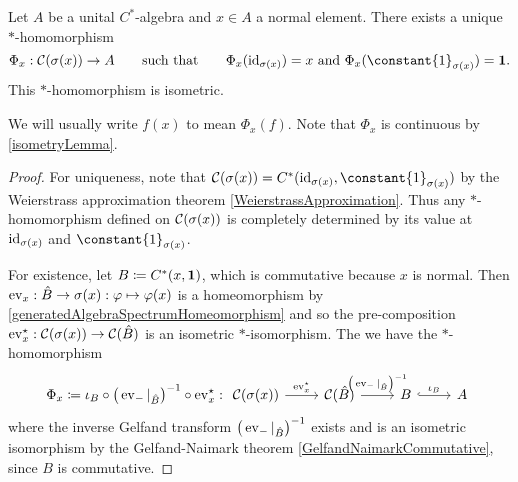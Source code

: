 \begin{theorem} \label{continuousFunctionalCalculus}
Let $A$ be a unital $C^*$-algebra and $x\in A$ a normal element. There exists a unique $*$-homomorphism
\[ \Phi_x: \cont(\spec(x))\to A \qquad \text{such that} \qquad \text{$\Phi_x(\id_{\spec(x)}) = x$ and $\Phi_x(\constant{1}_{\spec(x)}) = \vec{1}$.} \]
This $*$-homomorphism is isometric.
\end{theorem}
We will usually write $f(x)$ to mean $\Phi_x(f)$. Note that $\Phi_x$ is continuous by \ref{isometryLemma}.
\begin{proof}
For uniqueness, note that $\cont(\spec(x)) = C^*(\id_{\spec(x)}, \constant{1}_{\spec(x)})$ by the Weierstrass approximation theorem \ref{WeierstrassApproximation}. Thus any $*$-homomorphism defined on $\operatorname{\mathcal{C}}(\sigma(x))$ is completely determined by its value at $\operatorname{id}_{\sigma(x)}$ and $\constant{1}_{\spec(x)}$.

For existence, let $B \coloneqq C^*(x,\boldsymbol{\mathrm{1}})$, which is commutative because $x$ is normal. Then $\operatorname{ev}_x: \hat{B}\to \sigma(x): \varphi\mapsto \varphi(x)$ is a homeomorphism by \ref{generatedAlgebraSpectrumHomeomorphism} and so the pre-composition $\operatorname{ev}_x^\star: \mathcal{C}(\sigma(x))\to \mathcal{C}(\hat{B})$ is an isometric $*$-isomorphism. The we have the $*$-homomorphism
\[ \Phi_x \defeq \iota_B\circ\big(\evalMap_{-}|_{\hat{B}}\big)^{-1}\circ \evalMap_x^\star: \begin{tikzcd} \mathcal{C}(\sigma(x)) \ar[r, "{\evalMap_x^\star}"] & \mathcal{C}(\hat{B}) \ar[r, "\big(\evalMap_{-}|_{\hat{B}}\big)^{-1}"] & B \ar[r , hook, "\iota_B"] & A \end{tikzcd} \]
where the inverse Gelfand transform $\big(\operatorname{ev}_{-}|_{\hat{B}}\big)^{-1}$ exists and is an isometric isomorphism by the Gelfand-Naimark theorem \ref{GelfandNaimarkCommutative}, since $B$ is commutative.


\end{proof}
